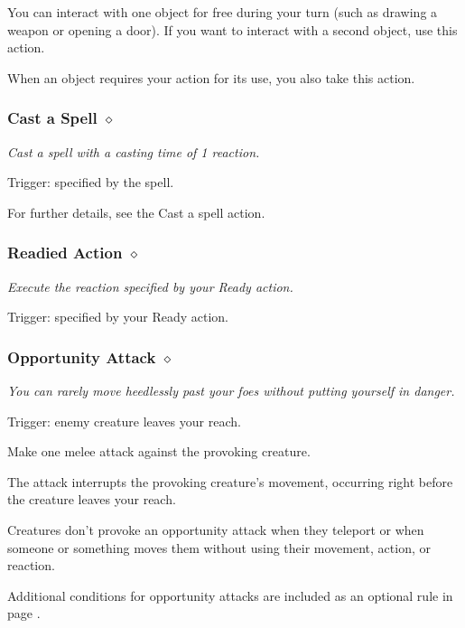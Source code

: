     You can interact with one object for free during your turn (such as drawing a weapon or opening a door).
    If you want to interact with a second object, use this action.

    When an object requires your action for its use, you also take this action.

\subsubsection{Cast a Spell $\diamond$}
    \textit{Cast a spell with a casting time of 1 reaction.}

    Trigger: specified by the spell.

    For further details, see the Cast a spell action.

\subsubsection{Readied Action $\diamond$}
    \textit{Execute the reaction specified by your Ready action.}

    Trigger: specified by your Ready action.

\subsubsection{Opportunity Attack $\diamond$}
    \textit{You can rarely move heedlessly past your foes without putting yourself in danger.}

    Trigger: enemy creature leaves your reach.

    Make one melee attack against the provoking creature.

    The attack interrupts the provoking creature's movement, occurring right before the creature leaves your reach.

    Creatures don't provoke an opportunity attack when they teleport or when someone or something moves them without using their movement, action, or reaction.

    Additional conditions for opportunity attacks are included as an optional rule in page \pageref{rule::opportunityattacks}.
